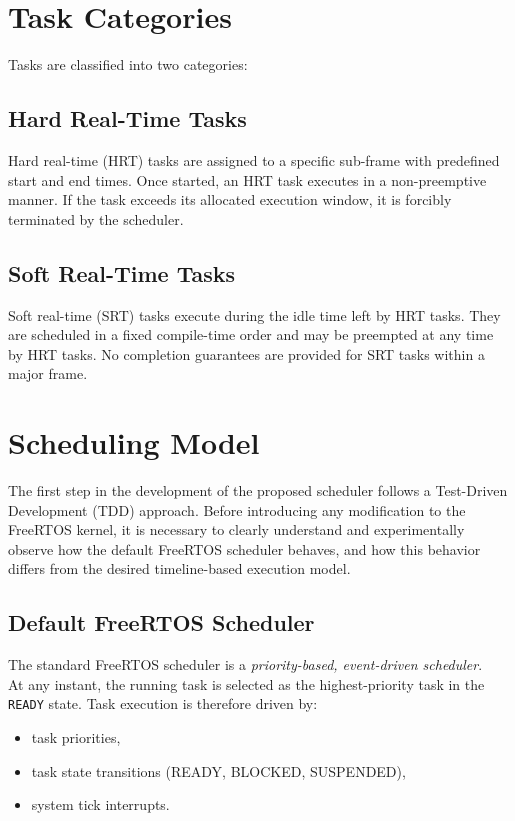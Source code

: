\documentclass[12pt,english, makeidx, a4paper, titlepage,oneside]{article}
\begin{document}
\section{Task Categories}
Tasks are classified into two categories:

\subsection{Hard Real-Time Tasks}
Hard real-time (HRT) tasks are assigned to a specific sub-frame with predefined start and end times.
Once started, an HRT task executes in a non-preemptive manner.
If the task exceeds its allocated execution window, it is forcibly terminated by the scheduler.

\subsection{Soft Real-Time Tasks}
Soft real-time (SRT) tasks execute during the idle time left by HRT tasks.
They are scheduled in a fixed compile-time order and may be preempted at any time by HRT tasks.
No completion guarantees are provided for SRT tasks within a major frame.

\section{Scheduling Model}

The first step in the development of the proposed scheduler follows a Test-Driven Development (TDD) approach.  
Before introducing any modification to the FreeRTOS kernel, it is necessary to clearly understand and experimentally observe how the default FreeRTOS scheduler behaves, and how this behavior differs from the desired timeline-based execution model.

\subsection{Default FreeRTOS Scheduler}

The standard FreeRTOS scheduler is a \emph{priority-based, event-driven scheduler}.\\
At any instant, the running task is selected as the highest-priority task in the \texttt{READY} state. Task execution is therefore driven by:
\begin{itemize}
    \item task priorities,
    \item task state transitions (READY, BLOCKED, SUSPENDED),
    \item system tick interrupts.
\end{itemize}
\end{document}
